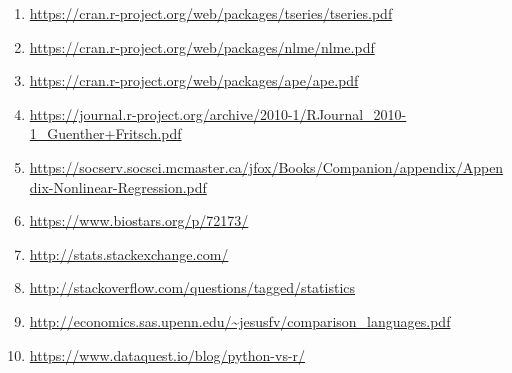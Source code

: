\documentclass [twoside,
  11pt, a4paper,
  footinclude=true,
  headinclude=true,
  cleardoublepage=empty
]{article}
\begin{document}
\begin{enumerate}
    \item \url{https://cran.r-project.org/web/packages/tseries/tseries.pdf}
    \item \url{https://cran.r-project.org/web/packages/nlme/nlme.pdf}
    \item \url{https://cran.r-project.org/web/packages/ape/ape.pdf}
    \item \url{https://journal.r-project.org/archive/2010-1/RJournal_2010-1_Guenther+Fritsch.pdf}
    \item \url{https://socserv.socsci.mcmaster.ca/jfox/Books/Companion/appendix/Appendix-Nonlinear-Regression.pdf} 
    \item \url{https://www.biostars.org/p/72173/}
        \item \url{http://stats.stackexchange.com/}
    \item \url{http://stackoverflow.com/questions/tagged/statistics}
    \item \url{http://economics.sas.upenn.edu/~jesusfv/comparison_languages.pdf}
    \item \url{https://www.dataquest.io/blog/python-vs-r/}

\end{enumerate}
\end{document}
